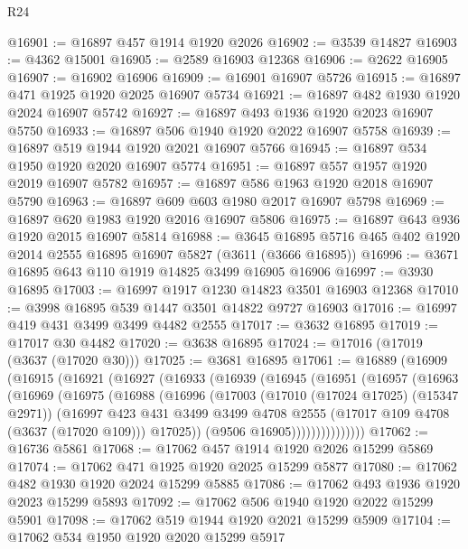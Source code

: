 \begin{lexlean}{R24}
\begin{coremodule}
@16901 := @16897 @457 @1914 @1920 @2026
@16902 := @3539 @14827
@16903 := @4362 @15001
@16905 := @2589 @16903 @12368
@16906 := @2622 @16905
@16907 := @16902 @16906
@16909 := @16901 @16907 @5726
@16915 := @16897 @471 @1925 @1920 @2025 @16907 @5734
@16921 := @16897 @482 @1930 @1920 @2024 @16907 @5742
@16927 := @16897 @493 @1936 @1920 @2023 @16907 @5750
@16933 := @16897 @506 @1940 @1920 @2022 @16907 @5758
@16939 := @16897 @519 @1944 @1920 @2021 @16907 @5766
@16945 := @16897 @534 @1950 @1920 @2020 @16907 @5774
@16951 := @16897 @557 @1957 @1920 @2019 @16907 @5782
@16957 := @16897 @586 @1963 @1920 @2018 @16907 @5790
@16963 := @16897 @609 @603 @1980 @2017 @16907 @5798
@16969 := @16897 @620 @1983 @1920 @2016 @16907 @5806
@16975 := @16897 @643 @936 @1920 @2015 @16907 @5814
@16988 := @3645 @16895 @5716 @465 @402 @1920 @2014 @2555 @16895 @16907 @5827 (@3611 (@3666 @16895))
@16996 := @3671 @16895 @643 @110 @1919 @14825 @3499 @16905 @16906
@16997 := @3930 @16895
@17003 := @16997 @1917 @1230 @14823 @3501 @16903 @12368
@17010 := @3998 @16895 @539 @1447 @3501 @14822 @9727 @16903
@17016 := @16997 @419 @431 @3499 @3499 @4482 @2555
@17017 := @3632 @16895
@17019 := @17017 @30 @4482
@17020 := @3638 @16895
@17024 := @17016 (@17019 (@3637 (@17020 @30)))
@17025 := @3681 @16895
@17061 := @16889
    (@16909
      (@16915
        (@16921
          (@16927
            (@16933
              (@16939
                (@16945
                  (@16951
                    (@16957
                      (@16963
                        (@16969
                          (@16975
                            (@16988
                              (@16996
                                (@17003
                                  (@17010 (@17024 @17025) (@15347 @2971))
                                  (@16997
                                    @423
                                    @431
                                    @3499
                                    @3499
                                    @4708
                                    @2555
                                    (@17017 @109 @4708 (@3637 (@17020 @109)))
                                    @17025))
                                (@9506 @16905)))))))))))))))
@17062 := @16736 @5861
@17068 := @17062 @457 @1914 @1920 @2026 @15299 @5869
@17074 := @17062 @471 @1925 @1920 @2025 @15299 @5877
@17080 := @17062 @482 @1930 @1920 @2024 @15299 @5885
@17086 := @17062 @493 @1936 @1920 @2023 @15299 @5893
@17092 := @17062 @506 @1940 @1920 @2022 @15299 @5901
@17098 := @17062 @519 @1944 @1920 @2021 @15299 @5909
@17104 := @17062 @534 @1950 @1920 @2020 @15299 @5917

\end{coremodule}
\end{lexlean}
